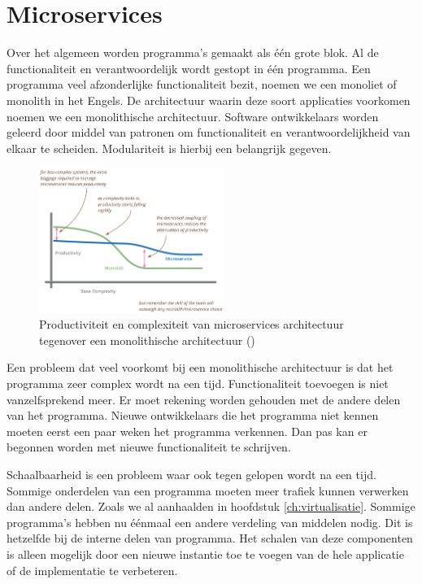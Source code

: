 \documentclass[pdftex,a4paper,12pt,twoside]{report}
\begin{document}
\section{Microservices}
\label{ch:microservices}

Over het algemeen worden programma's gemaakt als één grote blok. Al de functionaliteit en verantwoordelijk wordt gestopt in één programma. Een programma veel afzonderlijke functionaliteit bezit, noemen we een monoliet of monolith in het Engels. De architectuur waarin deze soort applicaties voorkomen noemen we een monolithische architectuur. Software ontwikkelaars worden geleerd door middel van patronen om functionaliteit en verantwoordelijkheid van elkaar te scheiden. Modulariteit is hierbij een belangrijk gegeven.

\begin{figure}
    \centering
    \includegraphics[width=6cm]{img/microservices_monolith}
    \caption{Productiviteit en complexiteit van microservices architectuur tegenover een monolithische architectuur (\cite{martin_fowler_microservicepremium_2015})}
    \label{fig:pr}
\end{figure}

Een probleem dat veel voorkomt bij een monolithische architectuur is dat het programma zeer complex wordt na een tijd. Functionaliteit toevoegen is niet vanzelfsprekend meer. Er moet rekening worden gehouden met de andere delen van het programma. Nieuwe ontwikkelaars die het programma niet kennen moeten eerst een paar weken het programma verkennen. Dan pas kan er begonnen worden met nieuwe functionaliteit te schrijven.

Schaalbaarheid is een probleem waar ook tegen gelopen wordt na een tijd. Sommige onderdelen van een programma moeten meer trafiek kunnen verwerken dan andere delen. Zoals we al aanhaalden in hoofdstuk \ref{ch:virtualisatie}. Sommige programma's hebben nu éénmaal een andere verdeling van middelen nodig. Dit is hetzelfde bij de interne delen van programma. Het schalen van deze componenten is alleen mogelijk door een nieuwe instantie toe te voegen van de hele applicatie of de implementatie te verbeteren.
\end{document}

